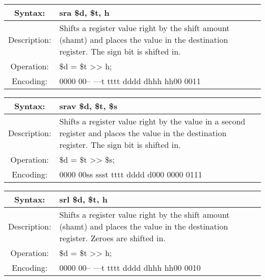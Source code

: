     \begin{table}[!hbp]
    \begin{tabularx}{\textwidth}{|c|X|}
        \hline
        Syntax: & sra \$d, \$t, h \\
        \hline
        Description: & Shifts a register value right by the shift 
                        amount (shamt) and places the value in the 
                        destination register. The sign bit is shifted in. \\
        \hline
        Operation: & \$d = \$t >> h; \\
        \hline
        Encoding: & 0000 00-- ---t tttt dddd dhhh hh00 0011 \\
        \hline
    \end{tabularx}
    \end{table}

    \begin{table}[!hbp]
    \begin{tabularx}{\textwidth}{|c|X|}
        \hline
        Syntax: & srav \$d, \$t, \$s \\
        \hline
        Description: & Shifts a register value right by the value in 
                        a second register and places the value in the 
                        destination register. The sign bit is shifted in. \\
        \hline
        Operation: & \$d = \$t >> \$s; \\
        \hline
        Encoding: & 0000 00ss ssst tttt dddd d000 0000 0111 \\
        \hline
    \end{tabularx}
    \end{table}

    \begin{table}[!hbp]
    \begin{tabularx}{\textwidth}{|c|X|}
        \hline
        Syntax: & srl \$d, \$t, h \\
        \hline
        Description: & Shifts a register value right by the shift
                         amount (shamt) and places the value in the 
                         destination register. Zeroes are shifted in. \\
        \hline
        Operation: & \$d = \$t >> h; \\
        \hline
        Encoding: & 0000 00-- ---t tttt dddd dhhh hh00 0010 \\
        \hline
    \end{tabularx}
    \end{table}


